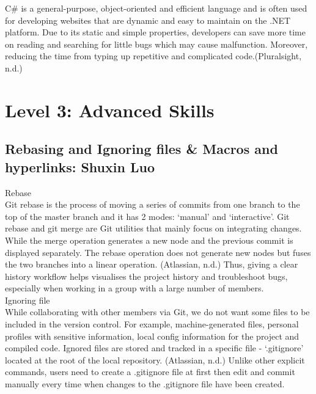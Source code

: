 \documentclass[a4paper, 11pt]{report}
\begin{document}
\noindent C\# is a general-purpose, object-oriented and efficient language and is often used for developing websites that are dynamic and easy to maintain on the .NET platform. Due to its static and simple properties, developers can save more time on reading and searching for little bugs which may cause malfunction. Moreover, reducing the time from typing up repetitive and complicated code.(Pluralsight, n.d.)\\
 





\newpage
\section{Level 3: Advanced Skills}
\subsection{Rebasing and Ignoring files \& Macros and hyperlinks: Shuxin Luo}

\newcommand{\gra}[2]{
\begin{figure}[h]
\texttt{[image: \#1]}
\caption{#2}
\label{fig: #1}
\end{figure}
}

\noindent Rebase\\
\noindent Git rebase is the process of moving a series of commits from one branch to the top of the master branch and it has 2 modes: ‘manual’ and ‘interactive’. Git rebase and git merge are Git utilities that mainly focus on integrating changes. While the merge operation generates a new node and the previous commit is displayed separately. The rebase operation does not generate new nodes but fuses the two branches into a linear operation. (Atlassian, n.d.) Thus, giving a clear history workflow helps visualises the project history and troubleshoot bugs, especially when working in a group with a large number of members.\\

\noindent Ignoring file\\
\noindent While collaborating with other members via Git, we do not want some files to be included in the version control. For example, machine-generated files, personal profiles with sensitive information, local config information for the project and compiled code. Ignored files are stored and tracked in a specific file - ‘.gitignore’ located at the root of the local repository. (Atlassian, n.d.) Unlike other explicit commands, users need to create a .gitignore file at first then edit and commit manually every time when changes to the .gitignore file have been created.\\
\end{document}
